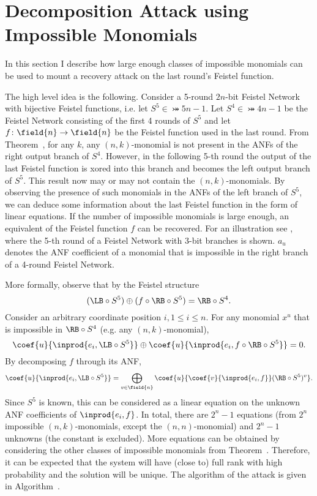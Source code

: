 \section{Decomposition Attack using Impossible Monomials}

\newcommand\func{f}

In this section I describe how large enough classes of impossible monomials can be used to mount a recovery attack on the last round's Feistel function.

The high level idea is the following. Consider a 5-round $2n$-bit Feistel Network with bijective Feistel functions, i.e. let $S^5 \in \bij{5}{n-1}$. Let $S^4 \in \bij{4}{n-1}$ be the Feistel Network consisting of the first 4 rounds of $S^5$ and let $\func\colon \field{n} \to \field{n}$ be the Feistel function used in the last round.
From Theorem~, for any $k$, any $(n,k)$-monomial is not present in the ANFs of the right output branch of $S^4$. However, in the following 5-th round the output of the last Feistel function is xored into this branch and becomes the left output branch of $S^5$. This result now may or may not contain the $(n,k)$-monomials. By observing the presence of such monomials in the ANFs of the left branch of $S^5$, we can deduce some information about the last Feistel function in the form of linear equations. If the number of impossible monomials is large enough, an equivalent of the Feistel function $f$ can be recovered. For an illustration see , where the 5-th round of a Feistel Network with 3-bit branches is shown. $a_u$ denotes the ANF coefficient of a monomial that is impossible in the right branch of a 4-round Feistel Network.


More formally, observe that by the Feistel structure 
$$(\LB \circ S^5) \oplus (f \circ \RB \circ S^5) = \RB \circ S^4.$$
Consider an arbitrary coordinate position $i, 1 \le i \le n$. For any monomial $x^u$ that is impossible in $\RB \circ S^4$ (e.g. any $(n,k)$-monomial),
$$
\coef{u}{\inprod{e_i, \LB \circ S^5}} \oplus
\coef{u}{\inprod{e_i, \func \circ \RB \circ S^5}} = 
0.
$$
By decomposing $\func$ through its ANF,
$$
\coef{u}{\inprod{e_i, \LB \circ S^5}} =
\bigoplus_{v \in \field{n}} \coef{u}{
    \coef{v}{\inprod{e_i, \func}}
    (\RB \circ S^5)^v}.
$$
Since $S^5$ is known, this can be considered as a linear equation on the unknown ANF coefficients of $\inprod{e_i, \func}$. In total, there are $2^n-1$ equations (from $2^n$ impossible $(n,k)$-monomials, except the $(n,n)$-monomial) and $2^n-1$ unknowns (the constant is excluded). More equations can be obtained by considering the other classes of impossible monomials from Theorem~. Therefore, it can be expected that the system will have (close to) full rank with high probability and the solution will be unique. The algorithm of the attack is given in Algorithm~.

